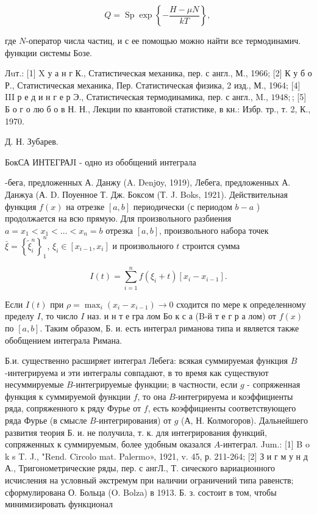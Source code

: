 \documentclass[10pt]{article}
\begin{document}
\[

Q=\operatorname{Sp} \exp \left\{-\frac{H-\mu N}{k T}\right\} \text {, }

\]



где $N$-оператор числа частиц, и с ее помощью можно найти все термодинамич. функции системы Бозе.



Лuт.: [1] X у а н г К., Статистическая механика, пер. с англ., М., 1966; [2] К у б о Р., Статистическая механика, Пер. Статистическая физика, 2 изд., М., 1964; [4] III р е д и н г е р Э., Статистическая термодинамика, пер. с англ., M., $1948 ;$; [5] Б о г о лю б о в Н. Н., Лекции по квантовой статистике, в кн.: Избр. тр., т. 2, К., 1970.



Д. Н. Зубарев.



БокСА ИНТЕГРАЈI - одно из обобщений интеграла

-бега, предложенных А. Данжу (A. Denjоy, 1919), Лебега, предложенных А. Данжуа (А. D. Поуенное Т. Дж. Боксом (Т. J. Boks, 1921). Действительная функция $f(x)$ на отрезке $[a, b]$ периодически (с периодом $b-a$ ) продолжается на всю прямую. Для произвольного разбиения $a=x_{1}<x_{1}<\ldots<x_{n}=b$ отрезка $[a, b]$, произвольного набора точек $\bar{\xi}=\left\{\tilde{\xi}_{i}^{n}\right\}_{1}^{n}$, $\xi_{i} \in\left[x_{i-1}, x_{i}\right]$ и произвольного $t$ строится сумма



\[

I(t)=\sum_{i=1}^{n} f\left(\xi_{i}+t\right)\left[x_{i}-x_{i-1}\right] .

\]



Если $I(t)$ при $\rho=\max _{i}\left(x_{i}-x_{i-1}\right) \longrightarrow 0$ сходится по мере к определенному пределу $I$, то число $I$ наз. и н т е гра лом Бо к с а (B-й т е г р а лом) от $f(x)$ по $[a, b]$. Таким образом, Б. и. есть интеграл риманова типа и является также обобщением интеграла Римана.



Б.и. существенно расширяет интеграл Лебега: всякая суммируемая функция $B$-интегрируема и эти интегралы совпадают, в то время как существуют несуммируемые $B$-интегрируемые функции; в частности, если $g$ - сопряженная функция к суммируемой функции $f$, то она $B$-интегрируема и коэффициенты ряда, сопряженного к ряду Фурье от $f$, есть коэффициенты соответствующего ряда Фурье (в смысле $B$-интегрирования) от $g$ (А, Н. Колмогоров). Дальнейшего развития теория Б. и. не получила, т. к. для интегрирования функций, сопряженных к суммируемым, более удобным оказался $A$-интеграл. Jum.: [1] B o k s T. J., "Rend. Circolo mat. Palermo», 1921, v. 45, р. 211-264; [2] З и г м у н д А., Тригонометрические ряды, пер. с ангЛ., Т. сического вариационного исчисления на условный әкстремум при наличии ограничений типа равенств; сформулирована О. Больца (O. Bolza) в 1913. Б. з. состоит в том, чтобы минимизировать функционал
\end{document}

